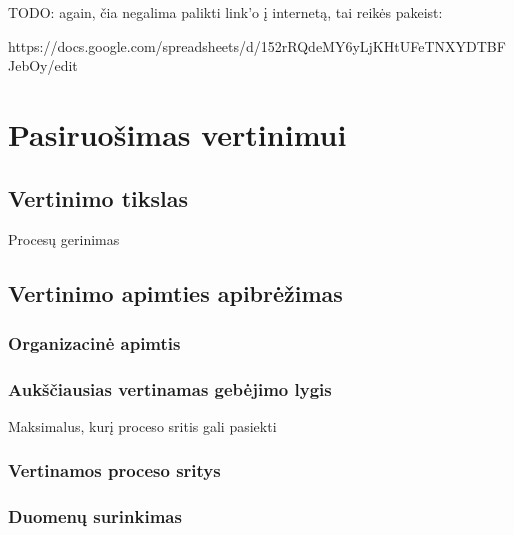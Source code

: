 TODO: again, čia negalima palikti link'o į internetą, tai reikės pakeist:

https://docs.google.com/spreadsheets/d/152rRQdeMY6yLjKHtUFeTNXYDTBFJebOy/edit

\section{Pasiruošimas vertinimui}
\subsection{Vertinimo tikslas}
Procesų gerinimas

\subsection{Vertinimo apimties apibrėžimas}
\subsubsection{Organizacinė apimtis}
\subsubsection{Aukščiausias vertinamas gebėjimo lygis}
 Maksimalus, kurį proceso sritis gali pasiekti
\subsubsection{Vertinamos proceso sritys}
\subsubsection{Duomenų surinkimas}
